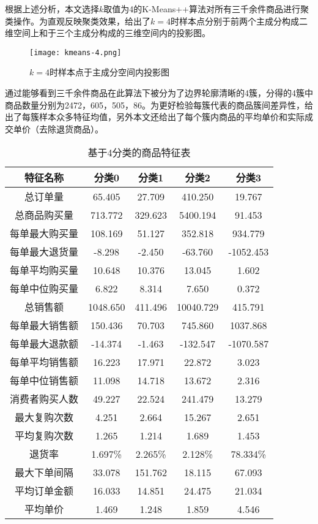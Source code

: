 \documentclass[lang=cn,11pt,a4paper,cite=authoryear]{elegantpaper}
\begin{document}
根据上述分析，本文选择$k$取值为4的K-Means++算法对所有三千余件商品进行聚类操作。为直观反映聚类效果，给出了$k=4$时样本点分别于前两个主成分构成二维空间上和于三个主成分构成的三维空间内的投影图。
\begin{figure}[H]
  \centering
  \texttt{[image: kmeans-4.png]}
  \caption{$k=4$时样本点于主成分空间内投影图}
  \label{4聚类二维三维图}
\end{figure}

通过能够看到三千余件商品在此算法下被分为了边界轮廓清晰的4簇，分得的4簇中商品数量分别为2472，605，505，86。为更好检验每簇代表的商品簇间差异性，给出了每簇样本众多特征均值，另外本文还给出了每个簇内商品的平均单价和实际成交单价（去除退货商品）。
\begin{center}
\begin{longtable}{c|c|c|c|c}
  \caption{基于4分类的商品特征表}
  \label{基于4分类的商品特征表}\\
    \hline
    \textbf{特征名称} & \textbf{分类0} & \textbf{分类1} & \textbf{分类2} & \textbf{分类3}\\
    \hline
    总订单量 & 65.405 & 27.709 & 410.250 & 19.767\\
    总商品购买量 & 713.772 & 329.623 & 5400.194 & 91.453\\
    每单最大购买量 & 108.169 & 51.127 & 352.818 & 934.779\\
    每单最大退货量 & -8.298 & -2.450 & -63.760 & -1052.453\\
    每单平均购买量 & 10.648 & 10.376 & 13.045 & 1.602\\
    每单中位购买量 & 6.822  & 8.314 & 7.650 & 0.372\\
    总销售额 & 1048.650 & 411.496 & 10040.729 & 415.791\\
    每单最大销售额 & 150.436 & 70.703 & 745.860 & 1037.868\\
    每单最大退款额 & -14.374 & -1.463 & -132.547 & -1070.587\\
    每单平均销售额 & 16.223 & 17.971 & 22.872 & 3.023\\
    每单中位销售额 & 11.098 & 14.718 & 13.672 & 2.316\\
    消费者购买人数 & 49.227 & 22.524 & 241.479 & 13.279\\
    最大复购次数 & 4.251 & 2.664 & 15.267 & 2.651\\
    平均复购次数 & 1.265 & 1.214 & 1.689 & 1.453\\
    退货率 & 1.697\% & 2.265\% & 2.128\% & 78.334\%\\
    最大下单间隔 & 33.078 & 151.762 & 18.115 & 67.093\\
    平均订单金额 & 16.033 & 14.851 & 24.475 & 21.034\\
    平均单价 & 1.469 & 1.248 & 1.859 & 4.546\\
    \hline
\end{longtable}
\end{center}
\end{document}
